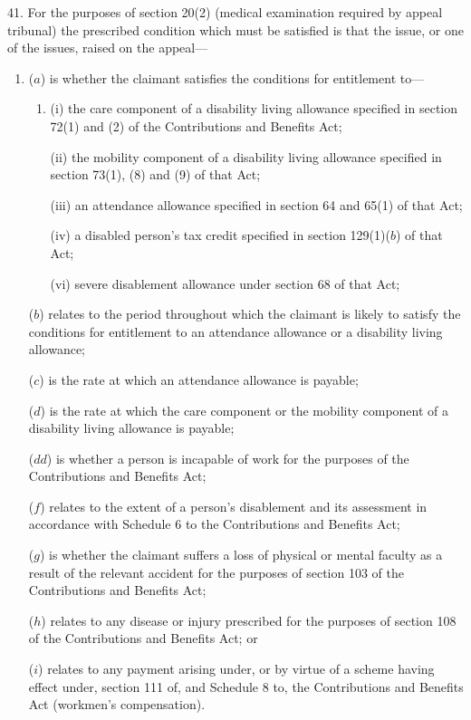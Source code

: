 \documentclass[12pt,a4paper]{article}
\begin{document}
41.  For the purposes of section 20(2) (medical examination required by appeal tribunal) the prescribed condition which must be satisfied is that the issue, or one of the issues, raised on the appeal—
\begin{enumerate}\item[]
($a$) is whether the claimant satisfies the conditions for entitlement to—
\begin{enumerate}\item[]
(i) the care component of a disability living allowance specified in section 72(1) and (2) of the Contributions and Benefits Act;

(ii) the mobility component of a disability living allowance specified in section 73(1), (8) and (9) of that Act;

(iii) an attendance allowance specified in section 64 and 65(1) of that Act;

(iv) a 
disabled person's tax credit  %
specified in section 129(1)($b$) of that Act;


(vi) severe disablement allowance under section 68 of that Act;
\end{enumerate}

($b$) relates to the period throughout which the claimant is likely to satisfy the conditions for entitlement to an attendance allowance or a disability living allowance;

($c$) is the rate at which an attendance allowance is payable;

($d$) is the rate at which the care component or the mobility component of a disability living allowance is payable;

($dd$) is whether a person is incapable of work for the purposes of the Contributions and Benefits Act;


($f$) relates to the extent of a person’s disablement and its assessment in accordance with Schedule 6 to the Contributions and Benefits Act;

($g$) is whether the claimant suffers a loss of physical or mental faculty as a result of the relevant accident for the purposes of section 103 of the Contributions and Benefits Act;

($h$) relates to any disease or injury prescribed for the purposes of section 108 of the Contributions and Benefits Act; or

($i$) relates to any payment arising under, or by virtue of a scheme having effect under, section 111 of, and Schedule 8 to, the Contributions and Benefits Act (workmen’s compensation).
\end{enumerate}
\end{document}

